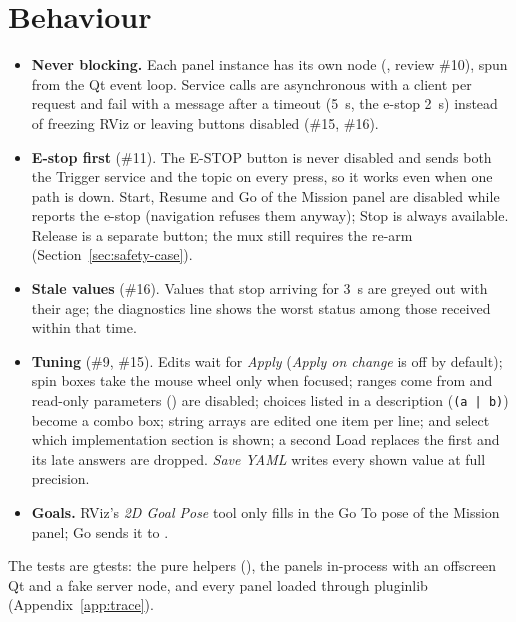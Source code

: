 \section{Behaviour}

\begin{itemize}
  \item \textbf{Never blocking.} Each panel instance has its own node
    (, review \#10), spun from the Qt event loop. Service
    calls are asynchronous with a client per request and fail with a message after a timeout
    (5~s, the e-stop 2~s) instead of freezing RViz or leaving buttons disabled (\#15, \#16).
  \item \textbf{E-stop first} (\#11). The E-STOP button is never disabled and sends both the
    Trigger service and the  topic on every press, so it works even
    when one path is down. Start, Resume and Go of the Mission panel are disabled while
     reports the e-stop (navigation refuses them anyway); Stop is always
    available. Release is a separate button; the mux still requires the re-arm
    (Section~\ref{sec:safety-case}).
  \item \textbf{Stale values} (\#16). Values that stop arriving for 3~s are greyed out with their
    age; the diagnostics line shows the worst status among those received within that time.
  \item \textbf{Tuning} (\#9, \#15). Edits wait for \emph{Apply} (\emph{Apply on change} is off by
    default); spin boxes take the mouse wheel only when focused; ranges come from
     and read-only parameters () are disabled; choices
    listed in a description (\texttt{(a | b)}) become a combo box; string arrays are edited one
    item per line;  and  select which implementation section is
    shown; a second Load replaces the first and its late answers are dropped. \emph{Save YAML}
    writes every shown value at full precision.
  \item \textbf{Goals.} RViz's \emph{2D Goal Pose} tool only fills in the Go To pose of the
    Mission panel; Go sends it to .
\end{itemize}

The tests are gtests: the pure helpers (), the panels in-process with an
offscreen Qt and a fake server node, and every panel loaded through pluginlib
(Appendix~\ref{app:trace}).
